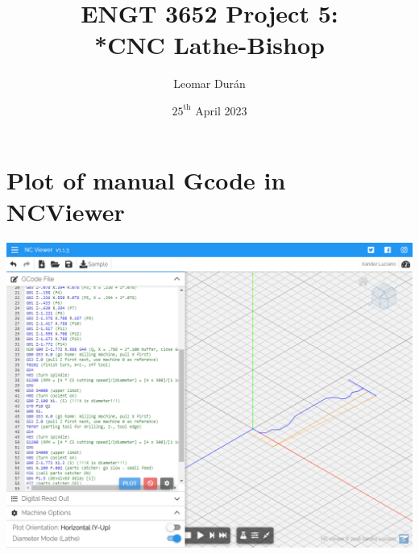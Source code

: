 \documentclass{report}
\title{ENGT 3652 Project 5:\\*CNC Lathe-Bishop}
\author{Leomar Dur\'an}
\date{${25}^{\text{th}}$ April 2023}
\begin{document}
\maketitle

\addtocounter{chapter}{1}


\chapter{Plot of manual Gcode in NCViewer}
\begin{landscape}
\includegraphics[height=\textheight]{img/prj05-manual-gcode-ncviewer-plot.png}
\end{landscape}

\addtocounter{chapter}{1}

\end{document}
